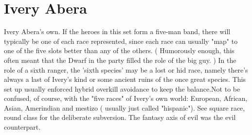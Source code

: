 \documentclass[12pt]{book}
\begin{document}
\chapter{Ivery Abera}

Ivery Abera's own. If the heroes in this set form a five-man band, there will typically be one of each race represented, since each race can usually "map" to one of the five slots better than any of the others. ( Humorously enough, this often meant that the Dwarf in the party filled the role of the big guy. ) In the role of a sixth ranger, the 'sixth species' may be a lost or hid race, namely there's always a last of Ivery's kind or some ancient ruins of the once great species. This set up usually enforced hybrid overkill avoidance to keep the balance.Not to be confused, of course, with the "five races" of Ivery's own world: European, African, Asian, Amerindian and mestizo ( usually just called "hispanic"). See square race, round class for the deliberate subversion. The fantasy axis of evil was the evil counterpart.
\end{document}
